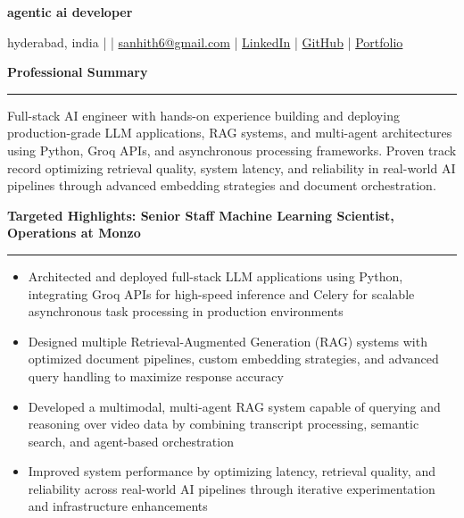 \documentclass[9pt, letterpaper]{article}
\newcommand{\name}[1]{%
    \begin{center}
        {\LARGE \textbf{#1}}
    \end{center}
}
\newcommand{\sectionheading}[1]{%
    \vspace{4pt}%
    {\large \textbf{#1}}%
    \vspace{1pt}%
    \hrule
    \vspace{2pt}%
}
\begin{document}
\name{agentic ai developer}
\begin{center}
    hyderabad, india \quad |  \quad | \quad
    \href{mailto:sanhith6@gmail.com}{sanhith6@gmail.com} \quad | \quad
    \href{https://www.linkedin.com/in/sanhith-reddy-740a1625b/}{LinkedIn} \quad | \quad
    \href{https://github.com/tsanhith}{GitHub} \quad | \quad
    \href{https://johndoe.dev}{Portfolio}
\end{center}

\vspace{0pt}

\sectionheading{Professional Summary}
Full-stack AI engineer with hands-on experience building and deploying production-grade LLM applications, RAG systems, and multi-agent architectures using Python, Groq APIs, and asynchronous processing frameworks. Proven track record optimizing retrieval quality, system latency, and reliability in real-world AI pipelines through advanced embedding strategies and document orchestration.

\sectionheading{Targeted Highlights: Senior Staff Machine Learning Scientist, Operations at Monzo}
\begin{itemize}[leftmargin=0.25in, itemindent=-0.15in, label={--}]
    \item Architected and deployed full-stack LLM applications using Python, integrating Groq APIs for high-speed inference and Celery for scalable asynchronous task processing in production environments
    \item Designed multiple Retrieval-Augmented Generation (RAG) systems with optimized document pipelines, custom embedding strategies, and advanced query handling to maximize response accuracy
    \item Developed a multimodal, multi-agent RAG system capable of querying and reasoning over video data by combining transcript processing, semantic search, and agent-based orchestration
    \item Improved system performance by optimizing latency, retrieval quality, and reliability across real-world AI pipelines through iterative experimentation and infrastructure enhancements
\end{itemize}
\end{document}
